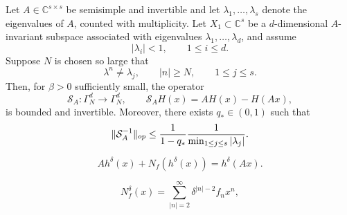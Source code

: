 \documentclass[10pt,a4paper]{amsart}
\begin{document}
\begin{proposition}\label{Lemma_SM}
Let $A\in\mathbb C^{s\times s}$ be semisimple and invertible and let $\lambda_1,\ldots,\lambda_s$ denote the eigenvalues of $A$, counted with
multiplicity. Let
$X_1\subset\mathbb C^s$ be a $d$-dimensional $A$-invariant subspace associated with
eigenvalues $\lambda_1,\ldots,\lambda_d$, and assume
\begin{equation}
        |\lambda_i|<1,
        \qquad
        1\leq i\leq d.
\end{equation}
Suppose $N$ is chosen so large that
\begin{equation}\label{nonres_tail}
        \lambda^n\ne \lambda_j,
        \qquad
        |n|\geq N,
        \qquad
        1\leq j\leq s.
\end{equation}
Then, for $\beta>0$ sufficiently small, the operator
\begin{equation}
        \mathcal S_A:\Gamma_N^d\to\Gamma_N^d,
        \qquad
        \mathcal S_A H(x)=AH(x)-H(Ax),
\end{equation}
is bounded and invertible. Moreover, there exists $q_*\in(0,1)$ such that
\begin{equation}\label{SA_inverse_bound}
        \|\mathcal S_A^{-1}\|_{\rm op}
        \le
        \frac{1}{1-q_*}
        \frac{1}{\min_{1\leq j\leq s}|\lambda_j|}.
\end{equation}
\end{proposition}

\begin{equation}\label{coholdelta}
Ah^\delta(x)+N_f(h^\delta(x))=h^\delta(Ax).
\end{equation}

\begin{equation}\label{N_f_expand}
N_f^\delta(x)=\sum_{|n|=2}^\infty \delta^{|n|-2} f_nx^n,
\end{equation}
\end{document}

